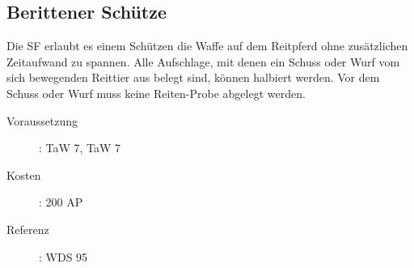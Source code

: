 \subsection{Berittener Schütze}
\label{sf.berittener_schuetze}
Die SF  erlaubt es einem Schützen die Waffe auf dem Reitpferd ohne zusätzlichen Zeitaufwand zu spannen.
Alle Aufschlage, mit denen ein Schuss oder Wurf vom sich bewegenden Reittier aus belegt sind, können halbiert werden. 
Vor dem Schuss oder Wurf muss keine Reiten-Probe abgelegt werden.
\begin{description}
    \item[Voraussetzung]:
        TaW  7, TaW  7
    \item [Kosten]:
        200 AP
    \item [Referenz]:
        WDS 95
\end{description}
